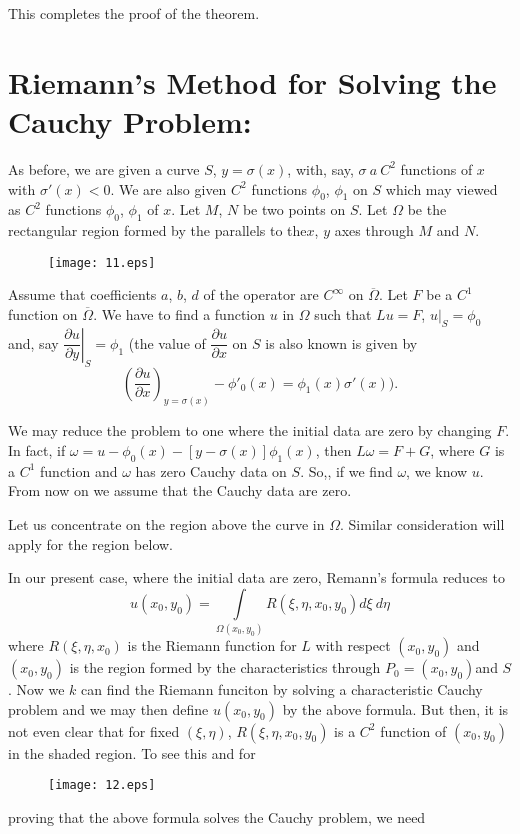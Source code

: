 This completes the proof of the theorem.

\section*{Riemann's Method for Solving the Cauchy Problem:}

As before, we are given a curve $S$, $y=\sigma (x)$, with, say, $\sigma \ a \ C^{2}$ functions of $x$ with $\sigma'(x)<0$. We are also given $C^{2}$ functions $\phi_{0}$, $\phi_{1}$ on $S$ which may viewed as $C^{2}$ functions $\phi_{0}$, $\phi_{1}$ of $x$. Let $M$, $N$ be two points on $S$. Let $\Omega$ be the rectangular region formed by the parallels to the\pageoriginale $x$, $y$ axes through $M$ and $N$.
\begin{figure}[H]
\centering
\texttt{[image: 11.eps]}
\end{figure}
\noindent
Assume that coefficients $a$, $b$, $d$ of the operator are $C^{\infty}$ on $\overline{\Omega}$. Let $F$ be a $C^{1}$ function on $\overline{\Omega}$. We have to find a function $u$ in $\Omega$ such that $Lu=F$, $u\big|_{S}=\phi_{0}$ and, say $\left.\dfrac{\partial u}{\partial y}\right|_{S}=\phi_{1}$ (the value of $\dfrac{\partial u}{\partial x}$ on $S$ is also known is given by
$$
\left(\dfrac{\partial u}{\partial x}\right)_{y=\sigma(x)}-\phi'_{0}(x)=\phi_{1}(x)\sigma'(x)).
$$

We may reduce the problem to one where the initial data are zero by changing $F$. In fact, if $\omega=u-\phi_{0}(x)-[y-\sigma(x)]\phi_{1}(x)$, then $L\omega=F+G$, where $G$ is a $C^{1}$ function and $\omega$ has zero Cauchy data on $S$. So,, if we find $\omega$, we know $u$. From now on we assume that the Cauchy data are zero.

Let us concentrate on the region above the curve in $\Omega$. Similar consideration will apply for the region below.

In our present case, where the initial data are zero, Remann's formula reduces to
$$
u(x_{0},y_{0})=\int\limits_{\Omega(x_{0},y_{0})}R(\xi, \eta, x_{0},y_{0})d\xi \ d\eta
$$
where $R(\xi,\eta,x_{0})$ is the Riemann function for $L$ with respect $(x_{0},y_{0})$ and $(x_{0},y_{0})$ is the region formed by the characteristics through $P_{0}=(x_{0},y_{0})$\pageoriginale and $S$. Now we $k$ can find the Riemann funciton by solving a characteristic Cauchy problem and we may then define $u(x_{0},y_{0})$ by the above formula. But then, it is not even clear that for fixed $(\xi,\eta)$, $R(\xi,\eta,x_{0},y_{0})$ is a $C^{2}$ function of $(x_{0},y_{0})$ in the shaded region. To see this and for 
\begin{figure}[H]
\centering
\texttt{[image: 12.eps]}
\end{figure}
proving that the above formula solves the Cauchy problem, we need

